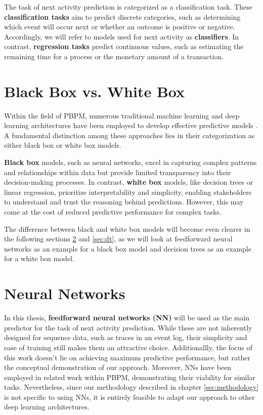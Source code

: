 The task of next activity prediction is categorized as a classification task.
These \textbf{classification tasks} aim to predict discrete categories,
such as determining which event will occur next or whether an outcome is positive or negative.
Accordingly, we will refer to models used for next activity as \textbf{classifiers}.
In contrast, \textbf{regression tasks} predict continuous values,
such as estimating the remaining time for a process or the monetary amount of a transaction.

\section{Black Box vs. White Box}
Within the field of PBPM, numerous traditional machine learning
and deep learning architectures have been employed
to develop effective predictive models \cite{ml_pbpm}.
A fundamental distinction among these approaches
lies in their categorization as either black box or white box models.

\textbf{Black box} models, such as neural networks,
excel in capturing complex patterns and relationships within data
but provide limited transparency into their decision-making processes.
In contrast, \textbf{white box} models, like decision trees or linear regression,
prioritize interpretability and simplicity,
enabling stakeholders to understand and trust the reasoning behind predictions.
However, this may come at the cost of reduced predictive performance for complex tasks.
\cite{black_white}

The difference between black and white box models will become even clearer
in the following sections \ref{sec:nn} and \ref{sec:dt},
as we will look at feedforward neural networks as an example for a black box model
and decision trees as an example for a white box model.

\section{Neural Networks}
\label{sec:nn}
In this thesis, \textbf{feedforward neural networks (NN)} 
will be used as the main predictor for the task of next activity prediction.
While these are not inherently designed for sequence data,
such as traces in an event log, their simplicity and ease of training still makes them an attractive choice.
Additionallly, the focus of this work doesn't lie on achieving maximum predictive performance,
but rather the conceptual demonstration of our approach.
Moreover, NNs have been employed in related work \cite{fairness_adversarial} within PBPM,
demonstrating their viability for similar tasks.
Nevertheless, since our methodology described in chapter \ref{sec:methodology}
is not specific to using NNs,
it is entirely feasible to adapt our approach to other deep learning architectures.

